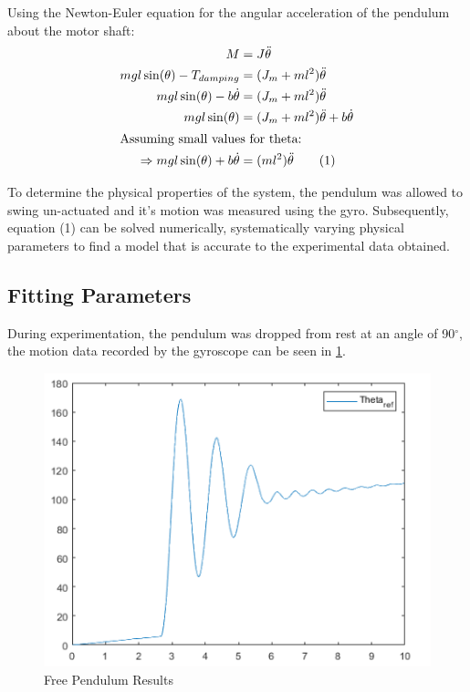 \documentclass[11pt, a4paper,twocolumn]{article}
\begin{document}
Using the Newton-Euler equation for the angular acceleration of the pendulum about the motor shaft:
\begin{align*}
	M &= J\ddot{\theta}	\\
	mgl\sin(\theta)-T_{damping} &= (J_m + ml^2)\ddot{\theta}\\
	mgl\sin(\theta) - b\dot\theta &= (J_m+ml^2)\ddot{\theta}\\
	mgl\sin(\theta) &= (J_m + ml^2)\ddot{\theta} + b\dot\theta\\
	\intertext{Assuming small values for theta:}
	\Rightarrow mgl\sin(\theta) + b\dot\theta &= (ml^2)\ddot{\theta} \qquad \text{(1)}\\
\end{align*}

To determine the physical properties of the system, the pendulum was allowed to swing un-actuated and it's motion was measured using the gyro. Subsequently, equation (1) can be solved numerically, systematically varying physical parameters to find a model that is accurate to the experimental data obtained.

\subsection{	Fitting Parameters	}

	During experimentation, the pendulum was dropped from rest at an angle of 90$^\circ$, the motion data recorded by the gyroscope can be seen in \ref{fig:free_pend}.

\begin{figure}[h!]
\centering
\includegraphics[scale=.5]{23}
\caption{Free Pendulum Results}
\label{fig:free_pend}
\end{figure}
\end{document}
